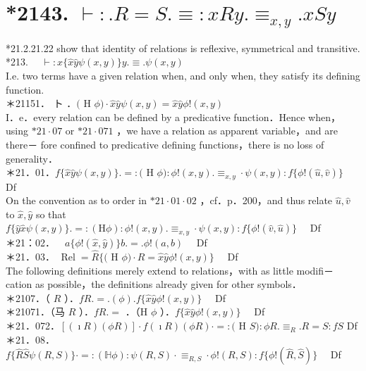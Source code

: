\documentclass[10pt]{article}
\begin{document}
\section*{*2143. $\vdash: . R=S . \equiv: x R y . \equiv_{x, y} . x S y$}
*21.2.21.22 show that identity of relations is reflexive, symmetrical and transitive.\\
*213. $\quad \vdash: x\{\widehat{x} \widehat{y} \psi(x, y)\} y . \equiv . \psi(x, y)$\\
I.e. two terms have a given relation when, and only when, they satisfy its defining function.\\
＊21151． ト ．$($ H $\phi) \cdot \hat{x} \hat{y} \psi(x, y)=\hat{x} \hat{y} \phi!(x, y)$\\
I．e．every relation can be defined by a predicative function．Hence when， using $* 21 \cdot 07$ or $* 21 \cdot 071$ ，we have a relation as apparent variable，and are there－ fore confined to predicative defining functions，there is no loss of generality．\\
＊21．01．$f\{\hat{x} \hat{y} \psi(x, y)\} .=:($ H $\phi): \phi!(x, y) . \equiv_{x, y} \cdot \psi(x, y): f\{\phi!(\hat{u}, \hat{v})\} \quad$ Df\\
On the convention as to order in $* 21 \cdot 01 \cdot 02$ ，cf．p．200，and thus relate $\hat{u}, \hat{v}$ to $\hat{x}, \hat{y}$ so that\\
$f\{\widehat{y} \widehat{x} \psi(x, y)\} .=:(\mathrm{H} \phi): \phi!(x, y) . \equiv_{x, y} \cdot \psi(x, y): f\{\phi!(\hat{v}, \hat{u})\} \quad$ Df\\
＊21：02．$\quad a\{\phi!(\hat{x}, \hat{y})\} b .=. \phi!(a, b) \quad$ Df\\
＊21．03． $\operatorname{Rel}=\widehat{R}\{($ H $\phi) \cdot R=\hat{x} \hat{y} \phi!(x, y)\} \quad$ Df\\
The following definitions merely extend to relations，with as little modifi－ cation as possible，the definitions already given for other symbols．\\
＊2107．（ $R$ ）．$f R .=.(\phi) . f\{\hat{x} \hat{y} \phi!(x, y)\} \quad$ Df\\
＊21071．（马 $R$ ）．$f R .=$ ．（H $\phi$ ）．$f\{\hat{x} \hat{y} \phi!(x, y)\} \quad$ Df\\
＊21．072．$[(\imath R)(\phi R)] \cdot f(\imath R)(\phi R) \cdot=:($ H $S): \phi R . \equiv_{R} . R=S: f S$ Df\\
＊21．08．$f\{\hat{R} \hat{S} \psi(R, S)\} \cdot=:(\mathbb{H} \phi): \psi(R, S) \cdot \equiv_{R, S} \cdot \phi!(R, S): f\{\phi!(\hat{R}, \hat{S})\} \quad$ Df\\
\end{document}
